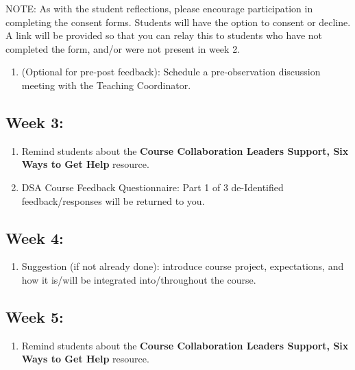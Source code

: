 \documentclass[
]{book}
\providecommand{\tightlist}{%
  \setlength{\itemsep}{0pt}\setlength{\parskip}{0pt}}
\begin{document}
NOTE: As with the student reflections, please encourage participation in completing the consent forms. Students will have the option to consent or decline. A link will be provided so that you can relay this to students who have not completed the form, and/or were not present in week 2.

\begin{enumerate}
\def\labelenumi{\arabic{enumi})}
\setcounter{enumi}{3}
\tightlist
\item
  (Optional for pre-post feedback): Schedule a pre-observation discussion meeting with the Teaching Coordinator.
\end{enumerate}

\hypertarget{week-3}{%
\subsection{Week 3:}\label{week-3}}

\begin{enumerate}
\def\labelenumi{\arabic{enumi})}
\item
  Remind students about the \textbf{Course Collaboration Leaders Support, Six Ways to Get Help} resource.
\item
  DSA Course Feedback Questionnaire: Part 1 of 3 de-Identified feedback/responses will be returned to you.
\end{enumerate}

\hypertarget{week-4}{%
\subsection{Week 4:}\label{week-4}}

\begin{enumerate}
\def\labelenumi{\arabic{enumi})}
\tightlist
\item
  Suggestion (if not already done): introduce course project, expectations, and how it is/will be integrated into/throughout the course.
\end{enumerate}

\hypertarget{week-5}{%
\subsection{Week 5:}\label{week-5}}

\begin{enumerate}
\def\labelenumi{\arabic{enumi})}
\tightlist
\item
  Remind students about the \textbf{Course Collaboration Leaders Support, Six Ways to Get Help} resource.
\end{enumerate}
\end{document}
